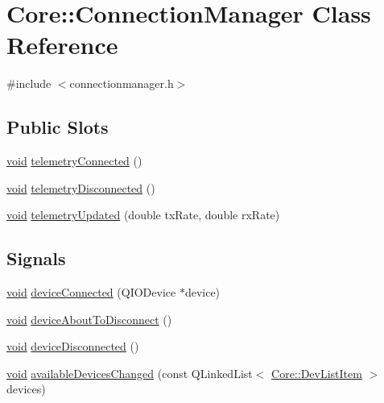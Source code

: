 \hypertarget{class_core_1_1_connection_manager}{\section{\-Core\-:\-:\-Connection\-Manager \-Class \-Reference}
\label{class_core_1_1_connection_manager}
}


{\ttfamily \#include $<$connectionmanager.\-h$>$}

\subsection*{\-Public \-Slots}
\begin{DoxyCompactItemize}
\item 
\hyperlink{group___u_a_v_objects_plugin_ga444cf2ff3f0ecbe028adce838d373f5c}{void} \hyperlink{group___core_plugin_ga4de138b49205db93c52a0b23f9147099}{telemetry\-Connected} ()
\item 
\hyperlink{group___u_a_v_objects_plugin_ga444cf2ff3f0ecbe028adce838d373f5c}{void} \hyperlink{group___core_plugin_ga4ab94ed9731bab394302b0d9e86712d4}{telemetry\-Disconnected} ()
\item 
\hyperlink{group___u_a_v_objects_plugin_ga444cf2ff3f0ecbe028adce838d373f5c}{void} \hyperlink{group___core_plugin_ga71e85da70aaddce0e037f95505cbc054}{telemetry\-Updated} (double tx\-Rate, double rx\-Rate)
\end{DoxyCompactItemize}
\subsection*{\-Signals}
\begin{DoxyCompactItemize}
\item 
\hyperlink{group___u_a_v_objects_plugin_ga444cf2ff3f0ecbe028adce838d373f5c}{void} \hyperlink{group___core_plugin_gaba707f1aa2a0ecd087c4918a4840257b}{device\-Connected} (\-Q\-I\-O\-Device $\ast$device)
\item 
\hyperlink{group___u_a_v_objects_plugin_ga444cf2ff3f0ecbe028adce838d373f5c}{void} \hyperlink{group___core_plugin_gaa4ac1fd6464703c0215cf028f42beac5}{device\-About\-To\-Disconnect} ()
\item 
\hyperlink{group___u_a_v_objects_plugin_ga444cf2ff3f0ecbe028adce838d373f5c}{void} \hyperlink{group___core_plugin_ga8978f471105c4f9a5525a175db4b3f29}{device\-Disconnected} ()
\item 
\hyperlink{group___u_a_v_objects_plugin_ga444cf2ff3f0ecbe028adce838d373f5c}{void} \hyperlink{group___core_plugin_ga3b0173c58f1af7e9d1140fcbdd3afd18}{available\-Devices\-Changed} (const \-Q\-Linked\-List$<$ \hyperlink{class_core_1_1_dev_list_item}{\-Core\-::\-Dev\-List\-Item} $>$ devices)
\end{DoxyCompactItemize}
